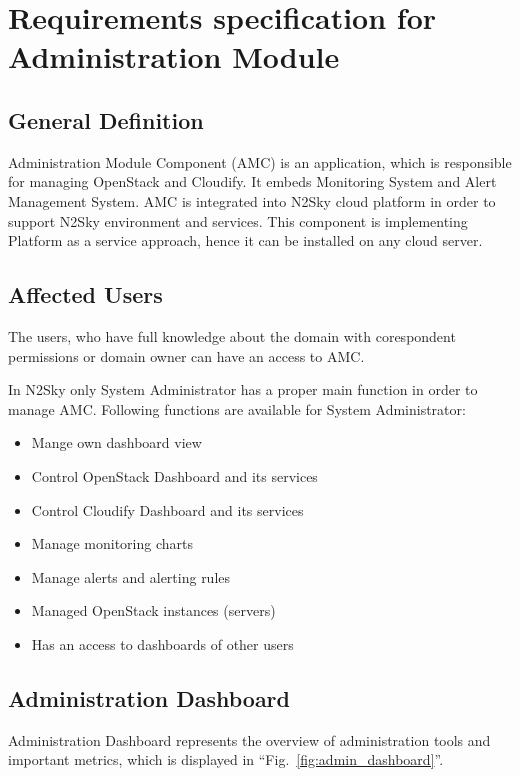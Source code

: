 \section{Requirements specification for Administration Module}\label{Administration components}

\subsection{General Definition}\label{General Definition AMC}

Administration Module Component (AMC) is an application, which is responsible for managing OpenStack and Cloudify. It embeds Monitoring System and Alert Management System. AMC is integrated into N2Sky cloud platform in order to support N2Sky environment and services. This component is implementing Platform as a service approach, hence it can be installed on any cloud server. 

\subsection{Affected Users}\label{Affected users}

The users, who have full knowledge about the domain with corespondent permissions or domain owner can have an access to AMC.

In N2Sky only System Administrator has a proper main function in order to manage AMC.
Following functions are available for System Administrator:
\begin{itemize}
\item Mange own dashboard view
\item Control OpenStack Dashboard and its services
\item Control Cloudify Dashboard and its services
\item Manage monitoring charts
\item Manage alerts and alerting rules
\item Managed OpenStack instances (servers)
\item Has an access to dashboards of other users
\end{itemize}



\subsection{Administration Dashboard}\label{Administration Dashboard}

Administration Dashboard represents the overview of administration tools and important metrics, which is displayed in ``Fig.~\ref{fig:admin_dashboard}''. 

